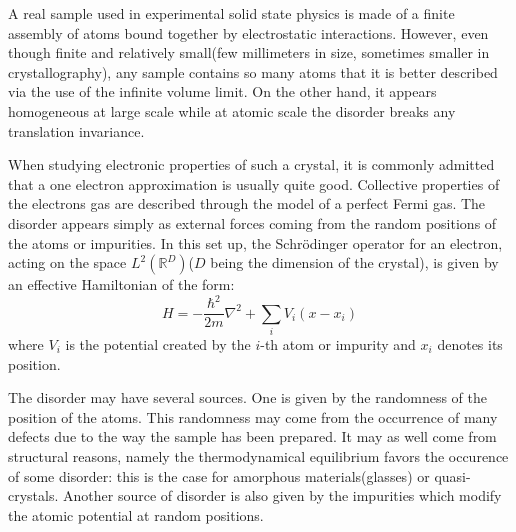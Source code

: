  A real sample used in experimental solid state physics is made of a finite assembly of atoms bound together by electrostatic interactions. However, even though finite and relatively small(few millimeters in size, sometimes smaller in crystallography), any sample contains so many atoms that it is better described via the use of the infinite volume limit. On the other hand, it appears homogeneous at large scale while at atomic scale the disorder breaks any translation invariance.

When studying electronic properties of such a crystal, it is commonly admitted that a one electron approximation is usually quite good. Collective properties of the electrons gas are described through the model of a perfect Fermi gas. The disorder appears simply as external forces coming from the random positions of the atoms or impurities. In this set up, the Schr{\"o}dinger operator for an electron, acting on the space $L^2(\mathbb{R}^D)$($D$ being the dimension of the crystal), is given by an effective Hamiltonian of the form:
\begin{equation}
H=-\frac{\hbar^2}{2m}\nabla^2+\sum_i V_i(x-x_i)
\end{equation}
where $V_i$ is the potential created by the $i$-th atom or impurity and $x_i$ denotes its position.

The disorder may have several sources. One is given by the randomness of the position of the atoms. This randomness may come from the occurrence of many defects due to the way the sample has been prepared. It may as well come from structural reasons, namely the thermodynamical equilibrium favors the occurence of some disorder: this is the case for amorphous materials(glasses) or quasi-crystals. Another source of disorder is also given by the impurities which modify the atomic potential at random positions.

